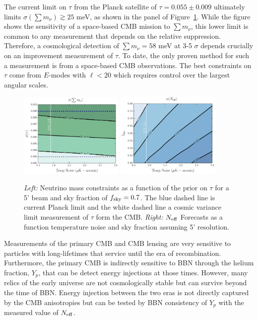 The current limit on $\tau$ from the Planck satellite of $\tau = 0.055 \pm 0.009$ ultimately limits $\sigma(\sum m_\nu) \gtrsim 25$ meV, as shown in the panel of Figure~\ref{fig:Neff_future}.  While the figure shows the sensitivity of a space-based CMB mission to $\sum m_\nu$, this lower limit is common to any measurement that depends on the relative suppression.  Therefore, a cosmological detection of $\sum m_\nu = 58$ meV at 3-5 $\sigma$ depends crucially on an improvement measurement of $\tau$.  To date, the only proven method for such a measurement is from a space-based CMB observations.  The best constraints on $\tau$ come from $E$-modes with $\ell < 20$ which requires control over the largest angular scales.  


\begin{figure}[t!]
\begin{center}
\includegraphics[width=0.45\textwidth]{figs/Mnu_tauprior.pdf}
\includegraphics[width=0.45\textwidth]{figs/Neff.pdf}
\caption{ {\it Left:} Neutrino mass constraints as a function of the prior on $\tau$ for a 5' beam and sky fraction of $f_{\rm sky} = 0.7$.  The blue dashed line is current Planck limit and the white dashed line a cosmic variance limit measurement of $\tau$ form the CMB. {\it Right:} ${N_{\rm eff}}$ Forecasts as a function temperature noise and sky fraction assuming 5' resolution.}
\label{fig:Neff_future}
\end{center}
\end{figure}

Measurements of the primary CMB and CMB lensing are very sensitive to particles with long-lifetimes that service until the era of recombination.  Furthermore, the primary CMB is indirectly sensitive to BBN through the helium fraction, $Y_p$, that can be detect energy injections at those times.  However, many relics of the early universe are not cosmologically stable but can survive beyond the time of BBN.  Energy injection between the two eras is not directly captured by the CMB anisotropies but can be tested by BBN consistency of $Y_p$ with the measured value of ${N_{\rm eff}}$.  

